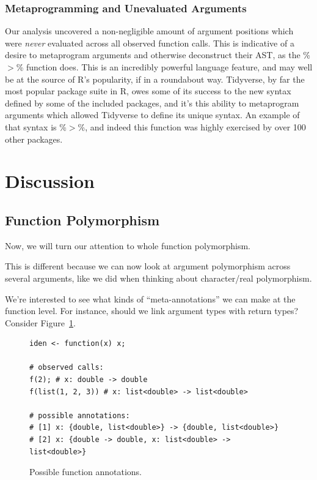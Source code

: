 \documentclass[acmsmall,10pt,review,anonymous]{acmart}\settopmatter{printfolios=true,printccs=false,printacmref=false}
\begin{document}
%
%
%
%
\subsubsection{Metaprogramming and Unevaluated Arguments}

Our analysis uncovered a non-negligible amount of argument positions which were {\it never} evaluated across all observed function calls.
This is indicative of a desire to metaprogram arguments and otherwise deconstruct their AST, as the \%$>$\% function does.
This is an incredibly powerful language feature, and may well be at the source of R's popularity, if in a roundabout way.
Tidyverse, by far the most popular package suite in R, owes some of its success to the new syntax defined by some of the included packages, and it's this ability to metaprogram arguments which allowed Tidyverse to define its unique syntax.
An example of that syntax is \%$>$\%, and indeed this function was highly exercised by over 100 other packages.

%
%
%
%
%
%
\section{Discussion}


%
%
%
%
\subsection{Function Polymorphism}


Now, we will turn our attention to whole function polymorphism.

This is different because we can now look at argument polymorphism across several arguments, like we did when thinking about character/real polymorphism.

We're interested to see what kinds of ``meta-annotations'' we can make at the function level.
For instance, should we link argument types with return types?
Consider Figure~\ref{fig:funanno}.
\begin{figure}[!hb]{\small\begin{lstlisting}[style=R]
iden <- function(x) x;

# observed calls:
f(2); # x: double -> double
f(list(1, 2, 3)) # x: list<double> -> list<double>

# possible annotations:
# [1] x: {double, list<double>} -> {double, list<double>}
# [2] x: {double -> double, x: list<double> -> list<double>}
\end{lstlisting}}\caption{Possible function annotations.}\label{fig:funanno}\end{figure}
\end{document}
